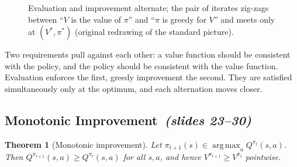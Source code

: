 \documentclass[11pt,a4paper]{article}
\DeclareMathOperator*{\argmax}{arg\,max}
\newcommand{\sltag}[1]{\texorpdfstring{\ \emph{(slides #1)}}{ (slides #1)}}
\theoremstyle{plain}
\newtheorem{theorem}{Theorem}[section]
\theoremstyle{definition}
\theoremstyle{remark}
\begin{document}
\begin{figure}[h]
\centering
{}
\caption{Evaluation and improvement alternate; the pair of iterates zig-zags between ``$V$ is the value of $\pi$'' and ``$\pi$ is greedy for $V$'' and meets only at $(V^*,\pi^*)$ (original redrawing of the standard picture).}
\end{figure}

\begin{intuition}
Two requirements pull against each other: a value function should be consistent with the policy, and the policy should be consistent with the value function. Evaluation enforces the first, greedy improvement the second. They are satisfied simultaneously only at the optimum, and each alternation moves closer.
\end{intuition}

\subsection{Monotonic Improvement\sltag{23--30}}
\begin{theorem}[Monotonic improvement]\label{thm:mono}
Let $\pi_{t+1}(s)\in\argmax_aQ^{\pi_t}(s,a)$. Then $Q^{\pi_{t+1}}(s,a)\ge Q^{\pi_t}(s,a)$ for all $s,a$, and hence $V^{\pi_{t+1}}\ge V^{\pi_t}$ pointwise.
\end{theorem}
\end{document}
